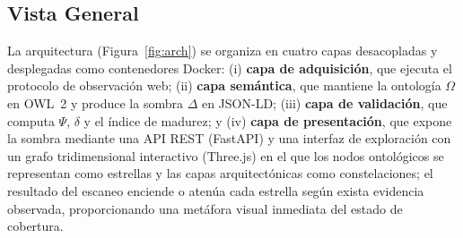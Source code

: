 \documentclass[computers,article,submit,pdftex,moreauthors]{Definitions/mdpi}
\begin{document}
\subsection{Vista General}
La arquitectura (Figura~\ref{fig:arch}) se organiza en cuatro capas desacopladas y desplegadas como contenedores Docker: (i) \textbf{capa de adquisición}, que ejecuta el protocolo de observación web; (ii) \textbf{capa semántica}, que mantiene la ontología $\Omega$ en OWL~2 y produce la sombra $\Delta$ en JSON-LD; (iii) \textbf{capa de validación}, que computa $\Psi$, $\delta$ y el índice de madurez; y (iv) \textbf{capa de presentación}, que expone la sombra mediante una API REST (FastAPI) y una interfaz de exploración con un grafo tridimensional interactivo (Three.js) en el que los nodos ontológicos se representan como estrellas y las capas arquitectónicas como constelaciones; el resultado del escaneo enciende o atenúa cada estrella según exista evidencia observada, proporcionando una metáfora visual inmediata del estado de cobertura.
\end{document}
